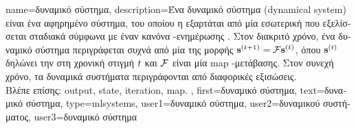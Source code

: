 {name={\foreignlanguage{greek}{δυναμικό σύστημα}},
	description={\foreignlanguage{greek}{Ένα δυναμικό σύστημα} 
		(dynamical system) \foreignlanguage{greek}{είναι ένα αφηρημένο σύστημα, του οποίου η}  
		 \foreignlanguage{greek}{εξαρτάται από μία εσωτερική}  
		\foreignlanguage{greek}{που εξελίσσεται σταδιακά σύμφωνα με έναν κανόνα} 
		-\foreignlanguage{greek}{ενημέρωσης} \cite{StrogatzBook}. 
		\foreignlanguage{greek}{Στον διακριτό χρόνο, ένα δυναμικό σύστημα περιγράφεται συχνά
		από μία}  \foreignlanguage{greek}{της μορφής}  
		${\bf s}^{(t+1)} =\mathcal{F} {\bf s}^{(t)}$, \foreignlanguage{greek}{όπου ${\bf s}^{(t)}$ 
		δηλώνει την}  \foreignlanguage{greek}{στη χρονική στιγμή $t$ και $\mathcal{F}$ 
		είναι μία} \gls{map} -\foreignlanguage{greek}{μετάβασης. Στον συνεχή χρόνο, τα δυναμικά 
		συστήματα περιγράφονται από διαφορικές εξισώσεις.}
		\\
		\foreignlanguage{greek}{Βλέπε επίσης:} \gls{output}, \gls{state}, \gls{iteration}, \gls{map}. },
	first={\foreignlanguage{greek}{δυναμικό σύστημα}},
	text={\foreignlanguage{greek}{δυναμικό σύστημα}},
	type=mlsystems,
	user1={\foreignlanguage{greek}{δυναμικό σύστημα}}, %
	user2={\foreignlanguage{greek}{δυναμικού συστήματος}}, %
	user3={\foreignlanguage{greek}{δυναμικό σύστημα}} %
}

